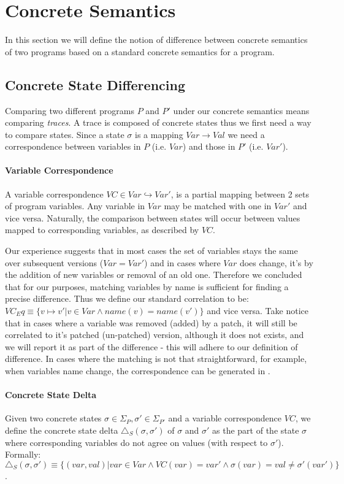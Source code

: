 \section{Concrete Semantics}
In this section we will define the notion of difference between concrete semantics of two programs based on a standard concrete semantics for a program.

\subsection{Concrete State Differencing} 
Comparing two different programs $P$ and $P'$ under our concrete semantics means comparing \emph{traces}. A trace is composed of concrete states thus we first need a way to compare states. Since a state $\sigma$ is a mapping $Var \rightarrow Val$ we need a correspondence between variables in $P$ (i.e. $Var$) and those in $P'$ (i.e. $Var'$).

\paragraph{Variable Correspondence} 
 A variable correspondence $VC \in Var \hookrightarrow Var'$, is a partial mapping between 2 sets of program variables. Any variable in $Var$ may be matched with one in $Var'$ and vice versa. Naturally, the comparison between states will occur between values mapped to corresponding variables, as described by $VC$.

Our experience suggests that in most cases the set of variables stays the same over subsequent versions ($Var = Var'$) and in cases where $Var$ does change, it's by the addition of new variables or removal of an old one. Therefore we concluded that for our purposes, matching variables by name is sufficient for finding a precise difference. Thus we define our standard correlation to be: $VC_Eq \equiv \{v \mapsto v' | v \in Var \wedge name(v) = name(v')\}$ and vice versa. Take notice that in cases where a variable was removed (added) by a patch, it will still be correlated to it's patched (un-patched) version, although it does not exists, and we will report it as part of the difference - this will adhere to our definition of difference. In cases where the matching is not that straightforward, for example, when variables name change, the correspondence can be generated in .

\paragraph{Concrete State Delta} 
Given two concrete states $\sigma \in \Sigma_P,\sigma' \in \Sigma_{P'}$ and a variable correspondence $VC$, we define the concrete state delta $\triangle_{S}(\sigma,\sigma')$ of $\sigma$ and $\sigma'$ as the part of the state $\sigma$ where corresponding variables do not agree on values (with respect to $\sigma'$). Formally: $\triangle_{S}(\sigma,\sigma') \equiv \{ (var,val) | var \in Var \wedge VC(var)=var' \wedge \sigma(var) = val \neq \sigma'(var')\}$.

